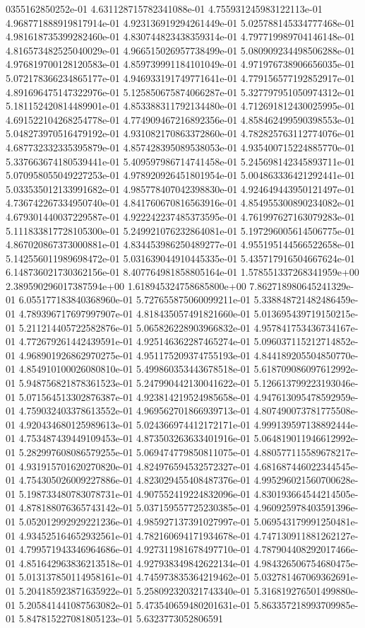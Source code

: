0355162850252e-01	4.631128715782341088e-01	4.755931245983122113e-01	4.968771888919817914e-01	4.923136919294261449e-01	5.025788145334777468e-01	4.981618735399282460e-01	4.830744823438359314e-01	4.797719989704146148e-01	4.816573482525040029e-01	4.966515026957738499e-01	5.080909234498506288e-01	4.976819700128120583e-01	4.859739991184101049e-01	4.971976738906656035e-01	5.072178366234865177e-01	4.946933191749771641e-01	4.779156577192852917e-01	4.891696475147322976e-01	5.125850675874066287e-01	5.327797951050974312e-01	5.181152420814489901e-01	4.853388311792134480e-01	4.712691812430025995e-01	4.691522104268254778e-01	4.774909467216892356e-01	4.858462499590398553e-01	5.048273970516479192e-01	4.931082170863372860e-01	4.782825763112774076e-01	4.687732332335395879e-01	4.857428395089538053e-01	4.935400715224885770e-01	5.337663674180539441e-01	5.409597986714741458e-01	5.245698142345893711e-01	5.070958055049227253e-01	4.978920926451801954e-01	5.004863336421292441e-01	5.033535012133991682e-01	4.985778407042398830e-01	4.924649443950121497e-01	4.736742267334950740e-01	4.841760670816563916e-01	4.854955300890234082e-01	4.679301440037229587e-01	4.922242237485373595e-01	4.761997627163079283e-01	5.111833817728105300e-01	5.249921076232864081e-01	5.197296005614506775e-01	4.867020867373000881e-01	4.834453986250489277e-01	4.955195144566522658e-01	5.142556011989698472e-01	5.031639044910445335e-01	5.435717916504667624e-01	6.148736021730362156e-01	8.407764981858805164e-01	1.578551337268341959e+00	2.389590296017387594e+00	1.618945324758685800e+00	7.862718980645241329e-01	6.055177183840368960e-01	5.727655875060099211e-01	5.338848721482486459e-01	4.789396717697997907e-01	4.818435057491821660e-01	5.013695439719150215e-01	5.211214405722582876e-01	5.065826228903966832e-01	4.957841753436734167e-01	4.772679261442439591e-01	4.925146362287465274e-01	5.096037115212714852e-01	4.968901926862970275e-01	4.951175209374755193e-01	4.844189205504850770e-01	4.854910100026080810e-01	5.499860353443678518e-01	5.618709086097612992e-01	5.948756821878361523e-01	5.247990442130041622e-01	5.126613799223193046e-01	5.071564513302876387e-01	4.923814219524985658e-01	4.947613095478592959e-01	4.759032403378613552e-01	4.969562701866939713e-01	4.807490073781775508e-01	4.920434680125989613e-01	5.024366974412172171e-01	4.999139597138892444e-01	4.753487439449109453e-01	4.873503263633401916e-01	5.064819011946612992e-01	5.282997608086579255e-01	5.069474779850811075e-01	4.880577115589678217e-01	4.931915701620270820e-01	4.824976594532572327e-01	4.681687446022344545e-01	4.754305026009227886e-01	4.823029455408487376e-01	4.995296021560700628e-01	5.198733480783078731e-01	4.907552419224832096e-01	4.830193664544214505e-01	4.878188076365743142e-01	5.037159557725230385e-01	4.960925978403591396e-01	5.052012992929221236e-01	4.985927137391027997e-01	5.069543179991250481e-01	4.934525164652932561e-01	4.782160694171934678e-01	4.747130911881262127e-01	4.799571943346964686e-01	4.927311981678497710e-01	4.787904408292017466e-01	4.851642963836213518e-01	4.927938349842622134e-01	4.984326506754680475e-01	5.013137850114958161e-01	4.745973835364219462e-01	5.032781467069362691e-01	5.204185923871635922e-01	5.258092320321743340e-01	5.316819276501499880e-01	5.205841441087563082e-01	5.473540659480201631e-01	5.863357218993709985e-01	5.847815227081805123e-01	5.6323773052806591